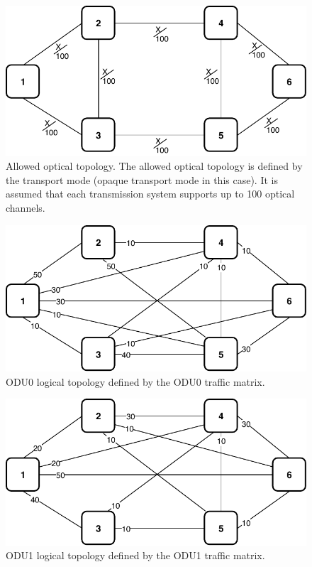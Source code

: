 \begin{figure}[h!]
\centering
\includegraphics[width=12cm]{sdf/ilp/opaque_survivability/figures/allowed_optical_topology}
\caption{Allowed optical topology. The allowed optical topology is defined by the transport mode (opaque transport mode in this case). It is assumed that each transmission system supports up to 100 optical channels.}
\label{allowed_optical_medium}
\end{figure}
\newpage
\begin{figure}[h!]
\centering
\includegraphics[width=12cm]{sdf/ilp/opaque_survivability/figures/logical_topology_ODU0_medium}
\caption{ODU0 logical topology defined by the ODU0 traffic matrix.}
\label{logical_ODU0_medium}
\end{figure}

\begin{figure}[h!]
\centering
\includegraphics[width=12cm]{sdf/ilp/opaque_survivability/figures/logical_topology_ODU1_medium}
\caption{ODU1 logical topology defined by the ODU1 traffic matrix.}
\label{logical_ODU1_medium}
\end{figure}

